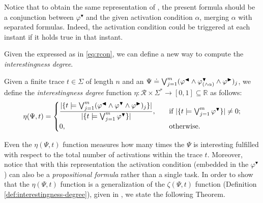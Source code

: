 Notice that to obtain the same representation of \cite{cecconi2018interestingness}, the present formula should be a conjunction between $\varphi^{\blacktriangledown}$ and the given activation condition $\alpha$, merging $\alpha$ with separated formulas. Indeed, the activation condition could be triggered at each instant if it holds true in that instant.


Given the \rcon\xspace expressed as in \ref{eq:rcon}, we can define a new way to compute the \textit{interestingness degree}.

\begin{definition}\label{def:new-int-deg}
Given a finite trace $t \in \Sigma$ of length $n$ and an \rcon\xspace $\Psi \doteq \bigvee^{m}_{j=1} (\varphi^{\blacktriangleleft} \wedge \varphi^{\blacktriangledown}_{(\wedge \alpha)} \wedge \varphi^{\blacktriangleright})_j$, we define the \emph{interestingness degree} function $\eta: \mathcal{R} \times \Sigma^* \rightarrow [0,1] \subseteq \mathbb{R}$ as follows:
\[   
\eta(\Psi,t) = 
     \begin{cases}
       \dfrac{\lvert \{t \models \bigvee^{m}_{j=1} (\varphi^{\blacktriangleleft} \wedge \varphi^{\blacktriangledown} \wedge \varphi^{\blacktriangleright})_j\} \rvert}{\lvert \{t \models \bigvee^{m}_{j=1} \varphi^{\blacktriangledown}\} \rvert}, &\quad\text{if } \lvert \{t \models \bigvee^{m}_{j=1} \varphi^{\blacktriangledown}\} \rvert \neq 0 ;\\
       0, &\quad\text{otherwise.} \\
     \end{cases}
\]
\end{definition}
Even the $\eta(\Psi, t)$ function measures how many times the \rcon\xspace $\Psi$ is interesting fulfilled with respect to the total number of activations within the trace $t$. Moreover, notice that with this representation the activation condition (embedded in the $\varphi^{\blacktriangledown}$) can also be a \textit{propositional formula} rather than a single task. In order to show that the $\eta(\Psi, t)$ function is a generalization of the $\zeta(\Psi, t)$ function (Definition \ref{def:interestingness-degree}), given in \cite{cecconi2018interestingness}, we state the following Theorem.

